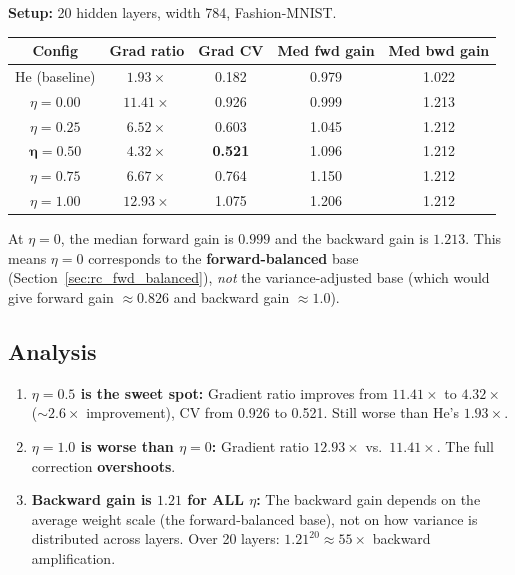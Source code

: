 \textbf{Setup:} 20 hidden layers, width 784, Fashion-MNIST.

\begin{center}
\begin{tabular}{ccccc}
\toprule
Config & Grad ratio & Grad CV & Med fwd gain & Med bwd gain \\
\midrule
He (baseline) & $1.93\times$ & 0.182 & 0.979 & 1.022 \\
$\eta = 0.00$ & $11.41\times$ & 0.926 & 0.999 & 1.213 \\
$\eta = 0.25$ & $6.52\times$ & 0.603 & 1.045 & 1.212 \\
$\bm{\eta = 0.50}$ & $\bm{4.32\times}$ & \textbf{0.521} & 1.096 & 1.212 \\
$\eta = 0.75$ & $6.67\times$ & 0.764 & 1.150 & 1.212 \\
$\eta = 1.00$ & $12.93\times$ & 1.075 & 1.206 & 1.212 \\
\bottomrule
\end{tabular}
\end{center}

\begin{flagbox}
At $\eta = 0$, the median forward gain is $0.999$ and the backward
gain is $1.213$.  This means $\eta = 0$ corresponds to the
\textbf{forward-balanced} base (Section~\ref{sec:rc_fwd_balanced}),
\emph{not} the variance-adjusted base (which would give forward
gain $\approx 0.826$ and backward gain $\approx 1.0$).
\end{flagbox}

\subsection{Analysis}

\begin{enumerate}
  \item \textbf{$\eta = 0.5$ is the sweet spot:}
        Gradient ratio improves from $11.41\times$ to $4.32\times$
        ($\sim 2.6\times$ improvement), CV from 0.926 to 0.521.
        Still worse than He's $1.93\times$.

  \item \textbf{$\eta = 1.0$ is worse than $\eta = 0$:}
        Gradient ratio $12.93\times$ vs.\ $11.41\times$.
        The full correction \textbf{overshoots}.

  \item \textbf{Backward gain is $1.21$ for ALL $\eta$:}
        The backward gain depends on the average weight scale
        (the forward-balanced base), not on how variance is
        distributed across layers.
        Over 20 layers: $1.21^{20} \approx 55\times$ backward
        amplification.
\end{enumerate}

